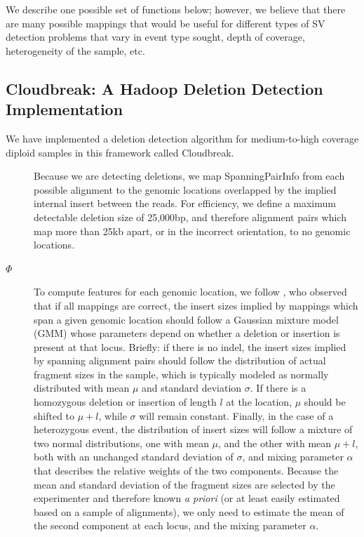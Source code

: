 \documentclass[11pt]{article}
\begin{document}
We describe one possible set of functions below; however, we believe that there are many possible mappings that would be useful for different types of SV detection problems that vary in event type sought, depth of coverage, heterogeneity of the sample, etc.

\subsection{Cloudbreak: A Hadoop Deletion Detection Implementation}

We have implemented a deletion detection algorithm for medium-to-high coverage diploid samples in this framework called Cloudbreak. 
\begin{description}
\item[] Because we are detecting deletions, we map SpanningPairInfo from each possible alignment to the genomic locations overlapped by the implied internal insert between the reads. For efficiency, we define a maximum detectable deletion size of 25,000bp, and therefore alignment pairs which map more than 25kb apart, or in the incorrect orientation, to no genomic locations.
\item[$\Phi$] To compute features for each genomic location, we follow \textcite{Lee:2009da}, who observed that if all mappings are correct, the insert sizes implied by mappings which span a given genomic location should follow a Gaussian mixture model (GMM) whose parameters depend on whether a deletion or insertion is present at that locus. Briefly: if there is no indel, the insert sizes implied by spanning alignment pairs should follow the distribution of actual fragment sizes in the sample, which is typically modeled as normally distributed with mean $\mu$ and standard deviation $\sigma$. If there is a homozygous deletion or insertion of length $l$ at the location, $\mu$ should be shifted to $\mu + l$, while $\sigma$ will remain constant. Finally, in the case of a heterozygous event, the distribution of insert sizes will follow a mixture of two normal distributions, one with mean $\mu$, and the other with mean $\mu + l$, both with an unchanged standard deviation of $\sigma$, and mixing parameter $\alpha$ that describes the relative weights of the two components. Because the mean and standard deviation of the fragment sizes are selected by the experimenter and therefore known \emph{a priori} (or at least easily estimated based on a sample of alignments), we only need to estimate the mean of the second component at each locus, and the mixing parameter $\alpha$.


\end{description}
\end{document}
